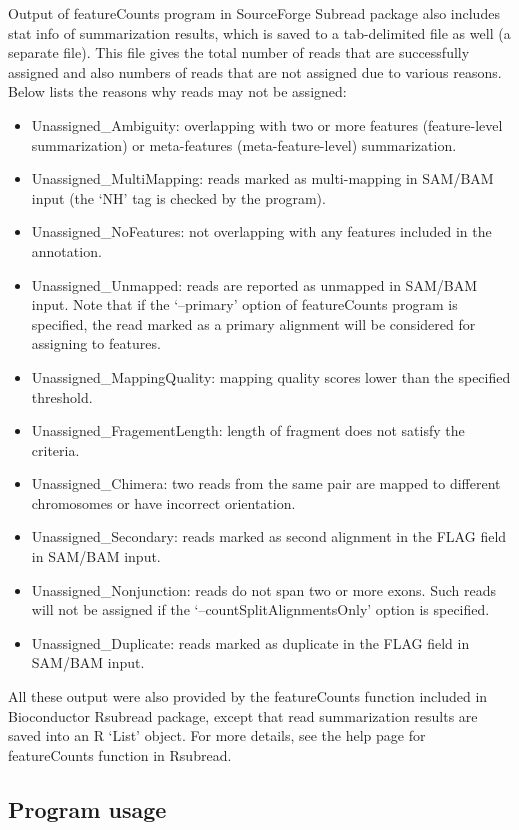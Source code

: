 \documentclass[12pt]{report}
\newcommand{\Subread}{\textsf{Subread}}
\newcommand{\Rsubread}{\textsf{Rsubread}}
\newcommand{\featureCounts}{\textsf{featureCounts}}
\newcommand{\R}{\textsf{R}}
\begin{document}
Output of {\featureCounts} program in SourceForge {\Subread} package also includes stat info of summarization results, which is saved to a tab-delimited file as well (a separate file).
This file gives the total number of reads that are successfully assigned and also numbers of reads that are not assigned due to various reasons.
Below lists the reasons why reads may not be assigned:
\begin{itemize}
\item Unassigned\_Ambiguity: overlapping with two or more features (feature-level summarization) or meta-features (meta-feature-level) summarization.
\item Unassigned\_MultiMapping: reads marked as multi-mapping in SAM/BAM input (the `NH' tag is checked by the program).
\item Unassigned\_NoFeatures: not overlapping with any features included in the annotation. 	
\item Unassigned\_Unmapped: reads are reported as unmapped in SAM/BAM input. Note that if the `--primary' option of featureCounts program is specified, the read marked as a primary alignment will be considered for assigning to features.
\item Unassigned\_MappingQuality: mapping quality scores lower than the specified threshold.
\item Unassigned\_FragementLength: length of fragment does not satisfy the criteria.
\item Unassigned\_Chimera: two reads from the same pair are mapped to different chromosomes or have incorrect orientation.
\item Unassigned\_Secondary: reads marked as second alignment in the FLAG field in SAM/BAM input. 	
\item Unassigned\_Nonjunction: reads do not span two or more exons. Such reads will not be assigned if the `--countSplitAlignmentsOnly' option is specified.
\item Unassigned\_Duplicate: reads marked as duplicate in the FLAG field in SAM/BAM input.
\end{itemize}

All these output were also provided by the {\featureCounts} function included in Bioconductor {\Rsubread} package, except that read summarization results are saved into an {\R} `List' object.
For more details, see the help page for {\featureCounts} function in {\Rsubread}.


\subsection{Program usage}
\end{document}
